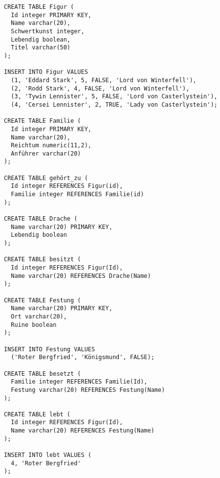 \documentclass{lehramt-informatik-aufgabe}
\begin{document}
\begin{verbatim}
CREATE TABLE Figur (
  Id integer PRIMARY KEY,
  Name varchar(20),
  Schwertkunst integer,
  Lebendig boolean,
  Titel varchar(50)
);

INSERT INTO Figur VALUES
  (1, 'Eddard Stark', 5, FALSE, 'Lord von Winterfell'),
  (2, 'Rodd Stark', 4, FALSE, 'Lord von Winterfell'),
  (3, 'Tywin Lennister', 5, FALSE, 'Lord von Casterlystein'),
  (4, 'Cersei Lennister', 2, TRUE, 'Lady von Casterlystein');

CREATE TABLE Familie (
  Id integer PRIMARY KEY,
  Name varchar(20),
  Reichtum numeric(11,2),
  Anführer varchar(20)
);

CREATE TABLE gehört_zu (
  Id integer REFERENCES Figur(id),
  Familie integer REFERENCES Familie(id)
);

CREATE TABLE Drache (
  Name varchar(20) PRIMARY KEY,
  Lebendig boolean
);

CREATE TABLE besitzt (
  Id integer REFERENCES Figur(Id),
  Name varchar(20) REFERENCES Drache(Name)
);

CREATE TABLE Festung (
  Name varchar(20) PRIMARY KEY,
  Ort varchar(20),
  Ruine boolean
);

INSERT INTO Festung VALUES
  ('Roter Bergfried', 'Königsmund', FALSE);

CREATE TABLE besetzt (
  Familie integer REFERENCES Familie(Id),
  Festung varchar(20) REFERENCES Festung(Name)
);

CREATE TABLE lebt (
  Id integer REFERENCES Figur(Id),
  Name varchar(20) REFERENCES Festung(Name)
);

INSERT INTO lebt VALUES (
  4, 'Roter Bergfried'
);
\end{verbatim}
\end{document}
